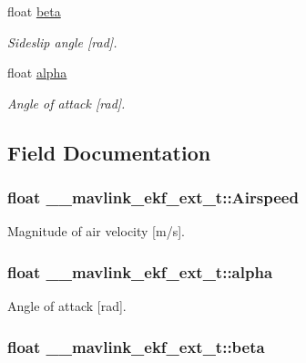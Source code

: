 \begin{DoxyCompactItemize}
float \hyperlink{struct____mavlink__ekf__ext__t_a8886574efef1a8816b5146baf9b7c5c1}{beta}
\begin{DoxyCompactList}\small\item\em Sideslip angle \mbox{[}rad\mbox{]}. \end{DoxyCompactList}\item 
float \hyperlink{struct____mavlink__ekf__ext__t_a2a8f53747cfc3010c311961d70d430b0}{alpha}
\begin{DoxyCompactList}\small\item\em Angle of attack \mbox{[}rad\mbox{]}. \end{DoxyCompactList}\end{DoxyCompactItemize}


\subsection{Field Documentation}
\hypertarget{struct____mavlink__ekf__ext__t_aba4f0a01a42dde62ef9ee8dcf5a36249}{
\subsubsection[{Airspeed}]{\setlength{\rightskip}{0pt plus 5cm}float \+\_\+\+\_\+mavlink\+\_\+ekf\+\_\+ext\+\_\+t\+::\+Airspeed}}\label{struct____mavlink__ekf__ext__t_aba4f0a01a42dde62ef9ee8dcf5a36249}


Magnitude of air velocity \mbox{[}m/s\mbox{]}. 

\hypertarget{struct____mavlink__ekf__ext__t_a2a8f53747cfc3010c311961d70d430b0}{
\subsubsection[{alpha}]{\setlength{\rightskip}{0pt plus 5cm}float \+\_\+\+\_\+mavlink\+\_\+ekf\+\_\+ext\+\_\+t\+::alpha}}\label{struct____mavlink__ekf__ext__t_a2a8f53747cfc3010c311961d70d430b0}


Angle of attack \mbox{[}rad\mbox{]}. 

\hypertarget{struct____mavlink__ekf__ext__t_a8886574efef1a8816b5146baf9b7c5c1}{
\subsubsection[{beta}]{\setlength{\rightskip}{0pt plus 5cm}float \+\_\+\+\_\+mavlink\+\_\+ekf\+\_\+ext\+\_\+t\+::beta}}\label{struct____mavlink__ekf__ext__t_a8886574efef1a8816b5146baf9b7c5c1}


